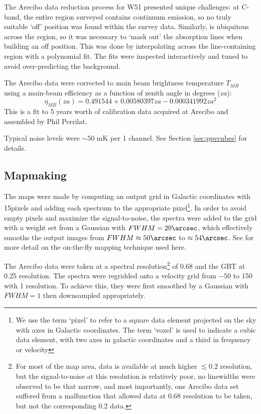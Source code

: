The Arecibo data reduction process for W51
presented unique challenges: at C-band, the entire region surveyed contains
continuum emission, so no truly suitable `off' position was found within the
survey data.  Similarly, \formaldehyde is ubiquitous across the region, so it
was necessary to `mask out' the absorption lines when building an off position.
This was done by interpolating across the line-containing region with a
polynomial fit.  The fits were inspected interactively
and tuned to avoid over-predicting the background.


The Arecibo data were corrected to main beam brightness temperature $T_{MB}$
using a main-beam efficiency as a function of zenith angle in degrees ($za$):
$$\eta_{MB}(za) = 0.491544 + 0.00580397 za - 0.000341992 za^2$$
This is a fit to 5 years worth of calibration data acquired at Arecibo and
assembled by Phil Perrilat.

Typical noise levels were $\sim50$ mK per 1 \kms channel.  See Section
\ref{sec:ppvcubes} for details.

\subsection{Mapmaking}
The maps were made by computing an output grid in Galactic coordinates with
15\arcsec pixels and adding each spectrum to the appropriate pixel\footnote{We
use the term `pixel' to refer to a square data element projected on the sky
with axes in Galactic coordinates.  The term `voxel' is used to indicate a cubic data
element, with two axes in galactic coordinates and a third in frequency or
velocity}.  In order
to avoid empty pixels and maximize the signal-to-noise, the spectra were added
to the grid with a weight set from a Gaussian with $FWHM=20\arcsec$, which
effectively smooths the output images from $FWHM\approx50\arcsec$ to
$\approx54\arcsec$.  See \citet{Mangum2007a} for more detail on the on-the-fly
mapping technique used here.

The Arecibo data were taken at a spectral resolution\footnote{For
most of the map area, data is available at much higher $\lesssim0.2$ \kms
resolution, but the signal-to-noise at this resolution is relatively poor, no
linewidths were observed to be that narrow, and most importantly, one Arecibo
data set suffered from a malfunction that allowed data at 0.68 \kms resolution
to be taken, but not the corresponding 0.2 \kms data.} of 0.68 \kms and the GBT
at 0.25 \kms resolution.  The spectra were regridded onto a velocity grid from
$-50$ to 150 \kms with 1 \kms resolution.  To achieve this, they were first
smoothed by a Gaussian with $FWHM=1$ \kms then downsampled appropriately.


